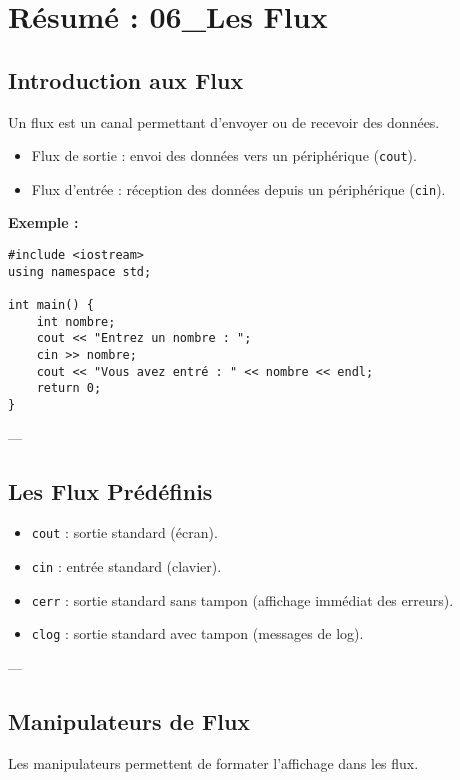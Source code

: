 \section{ Résumé : 06\_Les Flux}

\subsection{ Introduction aux Flux}
Un flux est un canal permettant d'envoyer ou de recevoir des données.
\begin{itemize}
    \item Flux de sortie : envoi des données vers un périphérique (\texttt{cout}).
    \item Flux d'entrée : réception des données depuis un périphérique (\texttt{cin}).
\end{itemize}

\textbf{Exemple :}
\begin{tcolorbox}[colframe=blue!50!black, colback=blue!5!white, title=Exemple de Flux]
\begin{verbatim}
#include <iostream>
using namespace std;

int main() {
    int nombre;
    cout << "Entrez un nombre : ";
    cin >> nombre;
    cout << "Vous avez entré : " << nombre << endl;
    return 0;
}
\end{verbatim}
\end{tcolorbox}

---

\subsection{ Les Flux Prédéfinis}
\begin{itemize}
    \item \texttt{cout} : sortie standard (écran).
    \item \texttt{cin} : entrée standard (clavier).
    \item \texttt{cerr} : sortie standard sans tampon (affichage immédiat des erreurs).
    \item \texttt{clog} : sortie standard avec tampon (messages de log).
\end{itemize}

---

\subsection{ Manipulateurs de Flux}
Les manipulateurs permettent de formater l'affichage dans les flux.

